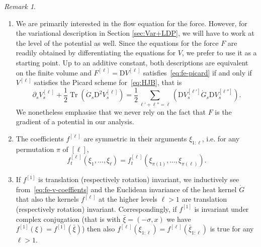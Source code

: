 \documentclass[11pt, a4paper]{scrartcl}
\numberwithin{equation}{section}
\theoremstyle{plain}
\theoremstyle{remark}
\newtheorem{remark}[foo]{Remark}
\newcommand{\mathD}{\mathrm{D}}
\newcommand{\tmdummy}{$\mbox{}$}
\newcommand{\tmop}[1]{\ensuremath{\operatorname{#1}}}
\newenvironment{enumeratealpha}{\begin{enumerate}[a{\textup{)}}] }{\end{enumerate}}
\begin{document}
\begin{remark}
	\label{rem:flow-eq}{\tmdummy}

	\begin{enumeratealpha}
		\item We are primarily interested in the flow equation for the force.
		However, for the variational description in Section \ref{sec:Var+LDP}, we
		will have to work at the level of the potential as well. Since the
		equations for the force $F$ are readily obtained by differentiating the
		equations for $V$, we prefer to use it as a starting point. Up to an
		additive constant, both descriptions are equivalent on the finite volume
		and $F^{[\ell]} = \mathD V^{[\ell]}$ satisfies~\eqref{eq:fe-picard} if and
		only if $V^{[\ell]}$ satisfies the Picard scheme for~\eqref{eq:HJB}, that
		is
		\begin{equation}
			\partial_s V^{[\ell]}_s + \frac{1}{2} \tmop{Tr} (\dot{G}_s \mathD^2
			V^{[\ell]}_s) = \frac{1}{2}\sum_{\ell' + \ell'' = \ell} (\mathD
			V_s^{[\ell']}  \dot{G}_s \mathD V^{[\ell'']}_s) . \label{eq:fe-V}
		\end{equation}
		We nonetheless emphasise that we never rely on the fact that $F$ is the
		gradient of a potential in our analysis.

		\item The coefficients $f^{[\ell]}$ are symmetric in their arguments
		$\xi_{1 : \ell}$, i.e. for any permutation $\pi$ of $[\ell]$,
		\begin{equation}
			f^{[\ell]}_t (\xi_1, \ldots, \xi_{\ell}) = f^{[\ell]}_t (\xi_{\pi (1)},
			\ldots, \xi_{\pi (\ell)}) . \label{eq:f-symm}
		\end{equation}
		\item \label{rem:translation-invariance}If $f^{[1]}$ is translation
		(respectively rotation) invariant, we inductively see
		from~\eqref{eq:fe-v-coeffients} and the Euclidean invariance of the heat
		kernel $\dot{G}$ that also the kernels $f^{[\ell]}$ at the higher levels
		$\ell > 1$ are translation (respectively rotation) invariant.
		Correspondingly, if $f^{[1]}$ is invariant under complex conjugation (that
		is with $\bar{\xi} = (- \sigma, x)$ we have $f^{[1]} (\xi) = f^{[1]}
			(\bar{\xi})$) then also $f^{[\ell]} (\xi_{1 : \ell}) = f^{[\ell]}
			(\bar{\xi}_{1 : \ell})$ is true for any $\ell > 1$.


\end{enumeratealpha}
\end{remark}
\end{document}
